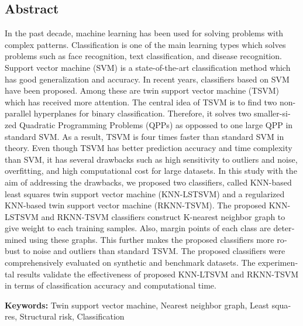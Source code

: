 \pagestyle{plain}


\begin{latin}
	
\section*{Abstract}
In the past decade, machine learning has been used for solving problems with complex patterns. Classification is one of the main learning types which solves problems such as face recognition, text classification, and disease recognition. Support vector machine (SVM) is a state-of-the-art classification method which has good generalization and accuracy. In recent years, classifiers based on SVM have been proposed. Among these are twin support vector machine (TSVM) which has received more attention. The central idea of TSVM is to find two non-parallel hyperplanes for binary classification. Therefore, it solves two smaller-sized Quadratic Programming Problems (QPPs) as oppossed to one large QPP in standard SVM. As a result, TSVM is four times faster than standard SVM in theory. Even though TSVM has better prediction accuracy and time complexity than SVM, it has several drawbacks such as high sensitivity to outliers and noise, overfitting, and high computational cost for large datasets. In this study with the aim of addressing the drawbacks, we proposed two classifiers, called KNN-based least squares twin support vector machine (KNN-LSTSVM) and a regularized KNN-based twin support vector machine (RKNN-TSVM). The proposed KNN-LSTSVM and RKNN-TSVM classifiers construct K-nearest neighbor graph to give weight to each training samples. Also, margin points of each class are determined using these graphs. This further makes the proposed classifiers more robust to noise and outliers than standard TSVM. The proposed classifiers were comprehensively evaluated on synthetic and benchmark datasets. The experimental results validate the effectiveness of proposed KNN-LTSVM and RKNN-TSVM in terms of classification accuracy and computational time.
	
\vspace{2cm}
\noindent \textbf{Keywords:}
Twin support vector machine, Nearest neighbor graph, Least squares, Structural risk, Classification 
	
\end{latin}